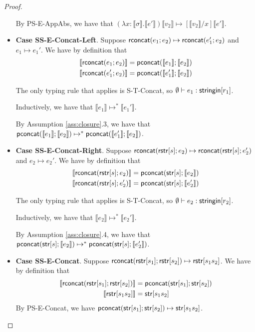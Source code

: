\documentclass[11pt,leqno]{article}
\theoremstyle{definition}
\newcommand{\stringin}[1]{{\sf stringin}[#1]}
\renewcommand{\tstr}[1]{{{\sf str}[#1]}}
\newcommand{\tconcat}[2]{{\sf pconcat}(#1;#2)} %
\newcommand{\trden}[1]{\llbracket #1 \rrbracket} %
\begin{document}
\begin{proof}
\begin{itemize}[label=$ $,itemsep=1ex]
By PS-E-AppAbs, we have that $(\lambda x : \trden{\sigma}. \trden{e'})\trden{v_2} \mapsto [\trden{v_2}/x]\trden{e'}$.

\item \textbf{Case SS-E-Concat-Left}.
Suppose ${\sf rconcat}(e_1;e_2) \mapsto {\sf rconcat}(e_1';e_2)$ and $e_1 \mapsto e_1'$. 
We have by definition that
\begin{align*}
  \trden{\rconcat{e_1}{e_2}} &= \tconcat{\trden{e_1}}{\trden{e_2}} \\
  \trden{\rconcat{e_1'}{e_2}} &= \tconcat{\trden{e_1'}}{\trden{e_2}}
\end{align*}

The only typing rule that applies is S-T-Concat, so $\emptyset \vdash e_1 : \stringin{r_1}$.

Inductively, we have that $\trden{e_1} \mapsto^* \trden{e_1'}$.

By Assumption \ref{ass:closure}.3, we have that 
$\tconcat{\trden{e_1}}{\trden{e_2}} \mapsto^* \tconcat{\trden{e_1'}}{\trden{e_2}}$.

\item \textbf{Case SS-E-Concat-Right}. 
Suppose ${\sf rconcat}({\sf rstr}[s];e_2) \mapsto {\sf rconcat}({\sf rstr}[s];e_2')$ and $e_2 \mapsto e_2'$. 
We have by definition that
\begin{align*}
  \trden{\rconcat{\rstr{s}}{e_2}} &= \tconcat{\tstr{s}}{\trden{e_2}} \\
  \trden{\rconcat{\rstr{s}}{e_2'}} &= \tconcat{\tstr{s}}{\trden{e_2'}}
\end{align*}

The only typing rule that applies is S-T-Concat, so $\emptyset \vdash e_2 : \stringin{r_2}$.

Inductively, we have that $\trden{e_2} \mapsto^* \trden{e_2'}$.

By Assumption \ref{ass:closure}.4, we have that 
$\tconcat{\tstr{s}}{\trden{e_2}} \mapsto^* \tconcat{\tstr{s}}{\trden{e_2'}}$.

\item \textbf{Case SS-E-Concat}. 
Suppose ${\sf rconcat}({\sf rstr}[s_1];{\sf rstr}[s_2]) \mapsto {\sf rstr}[s_1s_2]$.
We have by definition that
\begin{align*}
  \trden{\rconcat{\rstr{s_1}}{\rstr{s_2}}} &= \tconcat{\tstr{s_1}}{\tstr{s_2}} \\ 
  \trden{\rstr{s_1s_2}} &= \tstr{s_1s_2}
\end{align*}
By PS-E-Concat, we have 
$\tconcat{\tstr{s_1}}{\tstr{s_2}} \mapsto \tstr{s_1s_2}$.


\end{itemize}
\end{proof}
\end{document}
